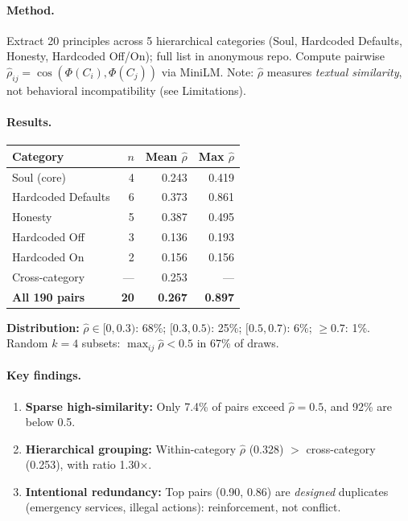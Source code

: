 \documentclass{article}
\theoremstyle{plain}
\theoremstyle{definition}
\theoremstyle{remark}
\newcommand{\rhohat}{\hat{\rho}}
\begin{document}
\paragraph{Method.} Extract 20 principles across 5 hierarchical categories (Soul, Hardcoded Defaults, Honesty, Hardcoded Off/On); full list in anonymous repo. Compute pairwise $\rhohat_{ij} = \cos(\Phi(C_i), \Phi(C_j))$ via MiniLM. Note: $\rhohat$ measures \emph{textual similarity}, not behavioral incompatibility (see Limitations).

\paragraph{Results.}
\begin{center}
\begin{tabular}{lrrr}
\toprule
Category & $n$ & Mean $\rhohat$ & Max $\rhohat$ \\
\midrule
Soul (core) & 4 & 0.243 & 0.419 \\
Hardcoded Defaults & 6 & 0.373 & 0.861 \\
Honesty & 5 & 0.387 & 0.495 \\
Hardcoded Off & 3 & 0.136 & 0.193 \\
Hardcoded On & 2 & 0.156 & 0.156 \\
\midrule
Cross-category & --- & 0.253 & --- \\
\textbf{All 190 pairs} & \textbf{20} & \textbf{0.267} & \textbf{0.897} \\
\bottomrule
\end{tabular}
\end{center}

\noindent\textbf{Distribution:} $\rhohat \in [0, 0.3)$: 68\%; $[0.3, 0.5)$: 25\%; $[0.5, 0.7)$: 6\%; $\ge 0.7$: 1\%. Random $k{=}4$ subsets: $\max_{ij}\rhohat < 0.5$ in 67\% of draws.

\paragraph{Key findings.}
\begin{enumerate}[nosep]
\item \textbf{Sparse high-similarity:} Only 7.4\% of pairs exceed $\rhohat{=}0.5$, and 92\% are below 0.5.
\item \textbf{Hierarchical grouping:} Within-category $\rhohat$ (0.328) $>$ cross-category (0.253), with ratio 1.30$\times$.
\item \textbf{Intentional redundancy:} Top pairs (0.90, 0.86) are \emph{designed} duplicates (emergency services, illegal actions): reinforcement, not conflict.
\end{enumerate}
\end{document}
